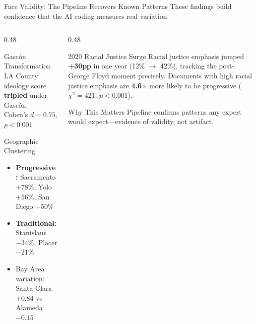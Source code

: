 \documentclass[aspectratio=169, 11pt]{beamer}
\begin{document}
\begin{frame}{Face Validity: The Pipeline Recovers Known Patterns}
{\small\color{gray} These findings build confidence that the AI coding measures real variation.}
\vspace{4pt}
\begin{columns}[T]
\begin{column}{0.48\textwidth}
\begin{block}{Gasc\'on Transformation}
LA County ideology score \textbf{tripled} under Gasc\'on\\
Cohen's $d = 0.75$, $p < 0.001$
\end{block}
\vspace{4pt}
\begin{block}{Geographic Clustering}
\begin{itemize}\setlength\itemsep{1pt}
    \item \textcolor{medalistgreen}{\textbf{Progressive:}} Sacramento $+78\%$, Yolo $+56\%$, San Diego $+50\%$
    \item \textcolor{alertred}{\textbf{Traditional:}} Stanislaus $-34\%$, Placer $-21\%$
    \item Bay Area variation: Santa Clara $+0.84$ vs Alameda $-0.15$
\end{itemize}
\end{block}
\end{column}
\begin{column}{0.48\textwidth}
\begin{block}{2020 Racial Justice Surge}
Racial justice emphasis jumped \textbf{+30pp} in one year (12\% $\to$ 42\%), tracking the post-George Floyd moment precisely.
\vspace{3pt}
Documents with high racial justice emphasis are \textbf{4.6$\times$} more likely to be progressive ($\chi^2 = 421$, $p < 0.001$).
\end{block}
\vspace{4pt}
\begin{exampleblock}{Why This Matters}
Pipeline confirms patterns any expert would expect---evidence of validity, not artifact.
\end{exampleblock}
\end{column}
\end{columns}
\end{frame}
\end{document}
